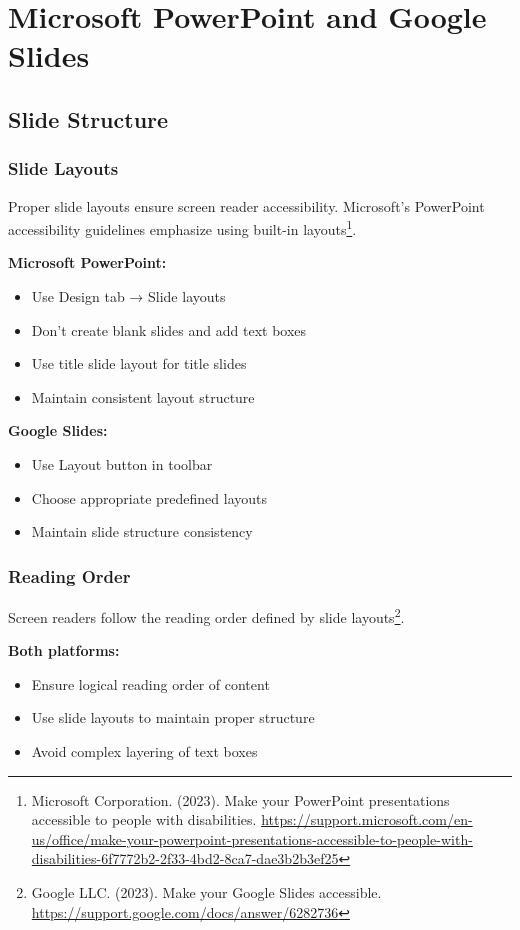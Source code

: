 \section{Microsoft PowerPoint and Google Slides}

\subsection{Slide Structure}

\subsubsection{Slide Layouts}
Proper slide layouts ensure screen reader accessibility. Microsoft's PowerPoint accessibility guidelines emphasize using built-in layouts\footnote{Microsoft Corporation. (2023). Make your PowerPoint presentations accessible to people with disabilities. \url{https://support.microsoft.com/en-us/office/make-your-powerpoint-presentations-accessible-to-people-with-disabilities-6f7772b2-2f33-4bd2-8ca7-dae3b2b3ef25}}.

\textbf{Microsoft PowerPoint:}
\begin{itemize}
\item Use Design tab → Slide layouts
\item Don't create blank slides and add text boxes
\item Use title slide layout for title slides
\item Maintain consistent layout structure
\end{itemize}

\textbf{Google Slides:}
\begin{itemize}
\item Use Layout button in toolbar
\item Choose appropriate predefined layouts
\item Maintain slide structure consistency
\end{itemize}

\subsubsection{Reading Order}
Screen readers follow the reading order defined by slide layouts\footnote{Google LLC. (2023). Make your Google Slides accessible. \url{https://support.google.com/docs/answer/6282736}}.

\textbf{Both platforms:}
\begin{itemize}
\item Ensure logical reading order of content
\item Use slide layouts to maintain proper structure
\item Avoid complex layering of text boxes
\end{itemize}


